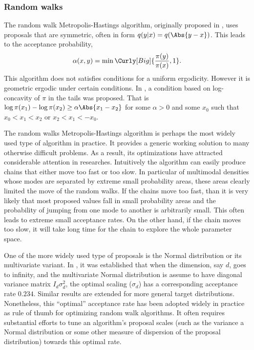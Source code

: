 \subsubsection{Random walks}
\label{ssub:Random walks}


The random walk Metropolis-Hastings algorithm, originally proposed in
\cite{Metropolis:1953ex}, uses proposals that are symmetric, often in form
$q(y|x) = q(\Abs{y - x})$. This leads to the acceptance probability,
\begin{equation}
  \alpha(x,y) = \min\Curly[Big]{\frac{\pi(y)}{\pi(x)},1}.
\end{equation}
This algorithm does not satisfies conditions for a uniform ergodicity.
However it is geometric ergodic under certain conditions. In
\cite{Mengersen:1996th}, a condition based on log-concavity of $\pi$ in the
tails was proposed. That is $\log\pi(x_1) - \log\pi(x_2) \ge \alpha\Abs{x_1 -
  x_2}$ for some $\alpha > 0$ and some $x_0$ such that $x_0 < x_1 < x_2$ or
$x_2 < x_1 < -x_0$.

The random walks Metropolis-Hastings algorithm is perhaps the most widely used
type of \mcmc algorithm in practice. It provides a generic working solution to
many otherwise difficult problems. As a result, its optimizations have
attracted considerable attention in researches. Intuitively the algorithm can
easily produce chains that either move too fast or too slow. In particular of
multimodal densities whose modes are separated by extreme small probability
areas, these areas clearly limited the move of the random walks. If the chains
move too fast, than it is very likely that most proposed values fall in small
probability areas and the probability of jumping from one mode to another is
arbitrarily small. This often leads to extreme small acceptance rates. On the
other hand, if the chain moves too slow, it will take long time for the chain
to explore the whole parameter space.

One of the more widely used type of proposals is the Normal distribution or
its multivariate variant. In \cite{Roberts:2001ta}, it was established that
when the dimension, say $d$, goes to infinity, and the multivariate Normal
distribution is assume to have diagonal variance matrix $I_d\sigma_d^2$, the
optimal scaling ($\sigma_d$) has a corresponding acceptance rate $0.234$.
Similar results are extended for more general target distributions.
Nonetheless, this ``optimal'' acceptance rate has been adopted widely in
practice as rule of thumb for optimizing random walk algorithms. It often
requires substantial efforts to tune an algorithm's proposal scales (such as
the variance a Normal distribution or some other measure of dispersion of the
proposal distribution) towards this optimal rate.

